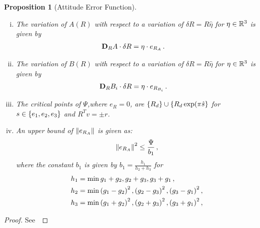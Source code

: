 \documentclass[letterpaper, 10 pt, conference]{ieeeconf}  %
\newtheorem{prop}{Proposition}
\begin{document}
\begin{prop}[Attitude Error Function]
\begin{enumerate}[(i)]
	\begin{align}
		\dirDiff{\Psi}{R} &= \dirDiff{A}{R} \,  B(R) + A \,  \dirDiff{B}{R} \, . \\
	\end{align}
	\item \label{item:prop_era}The variation of \( A(R) \) with respect to a variation of \( \delta R = R \hat{\eta} \) for \( \eta \in \mathbb{R}^3 \) is given by
	\begin{align}
		\mathbf{D}_{R} A \cdot \delta R &= \eta \cdot e_{R_A} \, .
	\end{align}
	\item \label{item:prop_erb} The variation of \( B(R) \) with respect to a variation of \( \delta R = R \hat{\eta} \) for \( \eta \in \mathbb{R}^3 \) is given by
	\begin{align}
		\mathbf{D}_{R} B_i \cdot \delta R &= \eta \cdot e_{R_{B_i}} \, .
	\end{align}
	\item \label{item:prop_crit}The critical points of \( \Psi \),where \( e_R = 0\), are \( \left\{ R_d \right\} \cup \left\{ R_d \exp(\pi \hat{s} \right\} \) for \( s \in \left\{ e_1, e_2, e_3 \right\} \) and \( R^T v = \pm r \).
	\item \label{item:prop_era_upbound}An upper bound of \( \left\| e_{R_A} \right\| \) is given as:
	\begin{align}
		\left\| e_{R_A} \right\|^2 \leq \frac{\Psi}{b_1} \, ,
	\end{align}
	where the constant \( b_1 \) is given by \( b_1 = \frac{h_1}{h_2 + h_3} \) for 
	\begin{align*}
		h_1 &= \min{g_1 + g_2, g_2 + g_3 , g_3 + g_1} \, ,\\
		h_2 &= \min{\ensuremath{\left( g_1 -g_2 \right)}^2,\ensuremath{\left( g_2 -g_3 \right)}^2 , \ensuremath{\left( g_3 -g_1 \right)}^2} \, ,\\
		h_3 &= \min{\ensuremath{\left( g_1 + g_2 \right)}^2, \ensuremath{\left( g_2 + g_3 \right)}^2 , \ensuremath{\left( g_3 + g_1 \right)}^2} \, ,\\				
	\end{align*}
\end{enumerate}
\end{prop}

\begin{proof}
	See~
\end{proof}
\end{document}
